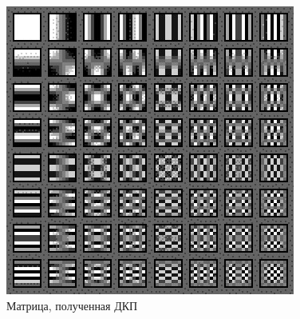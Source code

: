 \begin{figure}[H]
	\begin{center}
		\includegraphics[scale=1]{../pics/cosine_transform/matrix.png}
		\caption{Матрица, полученная ДКП}
		\label{pic:cosine_tranform:matrix}
	\end{center}
\end{figure}



